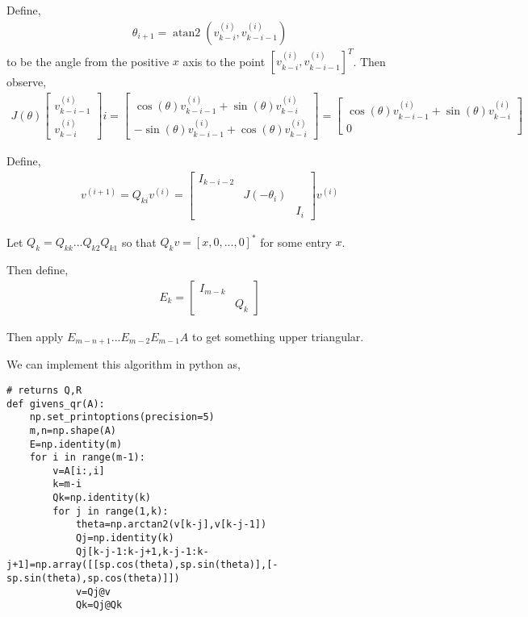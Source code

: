 \documentclass[10pt]{article}
\begin{document}
\begin{solution}[Solution]
\begin{enumerate}
        Define, 
        \begin{align*}
            \theta_{i+1}=\operatorname{atan2}(v^{(i)}_{k-i},v^{(i)}_{k-i-1})
        \end{align*}
        to be the angle from the positive \( x \) axis to the point \( [v^{(i)}_{k-i},v^{(i)}_{k-i-1}]^T \). 
        Then observe,
        \begin{align*}
            J(\theta)\left[\begin{array}{c}v^{(i)}_{k-i-1}\\v^{(i)}_{k-i}\end{array}\right] i
                = \left[\begin{array}{c}\cos(\theta)v^{(i)}_{k-i-1}+\sin(\theta)v^{(i)}_{k-i}\\ -\sin(\theta)v^{(i)}_{k-i-1}+\cos(\theta)v^{(i)}_{k-i}\end{array}\right]
                = \left[\begin{array}{c}\cos(\theta)v^{(i)}_{k-i-1}+\sin(\theta)v^{(i)}_{k-i}\\ 0 \end{array}\right]
        \end{align*} 

        Define,
        \begin{align*}
            v^{(i+1)} = Q_{ki}v^{(i)}=\left[\begin{array}{ccc}I_{k-i-2} \\ & J(-\theta_i) \\ & & I_{i}\end{array}\right]v^{(i)} 
        \end{align*}
        
        Let \( Q_k=Q_{kk}...Q_{k2}Q_{k1} \) so that \( Q_kv = [x,0,...,0]^* \) for some entry \( x \).

        Then define,
        \begin{align*}
            E_{k} = \left[\begin{array}{cc}I_{m-k}\\&Q_k\end{array}\right]
        \end{align*}

        Then apply \( E_{m-n+1}...E_{m-2}E_{m-1} A \) to get something upper triangular.

We can implement this algorithm in python as,
\begin{lstlisting}
# returns Q,R
def givens_qr(A):
    np.set_printoptions(precision=5)
    m,n=np.shape(A)
    E=np.identity(m)
    for i in range(m-1):
        v=A[i:,i]
        k=m-i
        Qk=np.identity(k)
        for j in range(1,k):
            theta=np.arctan2(v[k-j],v[k-j-1])
            Qj=np.identity(k)
            Qj[k-j-1:k-j+1,k-j-1:k-j+1]=np.array([[sp.cos(theta),sp.sin(theta)],[-sp.sin(theta),sp.cos(theta)]])
            v=Qj@v
            Qk=Qj@Qk
        

\end{lstlisting}
\end{enumerate}
\end{solution}
\end{document}
